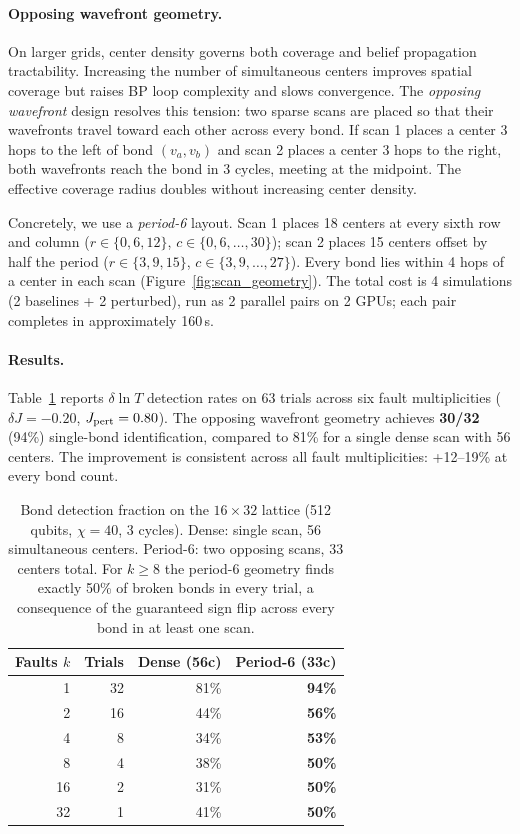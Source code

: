 \documentclass[11pt]{article}
\begin{document}
\paragraph{Opposing wavefront geometry.}
On larger grids, center density governs both coverage and belief propagation
tractability. Increasing the number of simultaneous centers improves spatial
coverage but raises BP loop complexity and slows convergence. The \emph{opposing
wavefront} design resolves this tension: two sparse scans are placed so that
their wavefronts travel toward each other across every bond. If scan 1 places a
center 3 hops to the left of bond $(v_a, v_b)$ and scan 2 places a center 3
hops to the right, both wavefronts reach the bond in 3 cycles, meeting at the
midpoint. The effective coverage radius doubles without increasing center density.

Concretely, we use a \emph{period-6} layout. Scan 1 places 18 centers at every
sixth row and column ($r \in \{0,6,12\}$, $c \in \{0,6,\ldots,30\}$); scan 2
places 15 centers offset by half the period ($r \in \{3,9,15\}$,
$c \in \{3,9,\ldots,27\}$). Every bond lies within 4 hops of a center in each
scan (Figure~\ref{fig:scan_geometry}).
The total cost is 4 simulations (2 baselines + 2 perturbed), run as 2 parallel
pairs on 2 GPUs; each pair completes in approximately 160\,s.

\paragraph{Results.}
Table~\ref{tab:scaling} reports $\delta\!\ln T$ detection rates on 63 trials
across six fault multiplicities ($\delta J = -0.20$, $J_{\rm pert} = 0.80$).
The opposing wavefront geometry achieves \textbf{30/32} (94\%) single-bond
identification, compared to 81\% for a single dense scan with 56 centers. The
improvement is consistent across all fault multiplicities: +12--19\% at every
bond count.

\begin{table}[h]
\centering
\small
\begin{tabular}{rrrr}
\toprule
Faults $k$ & Trials & Dense (56c) & Period-6 (33c) \\
\midrule
 1 & 32 & 81\% & \textbf{94\%} \\
 2 & 16 & 44\% & \textbf{56\%} \\
 4 &  8 & 34\% & \textbf{53\%} \\
 8 &  4 & 38\% & \textbf{50\%} \\
16 &  2 & 31\% & \textbf{50\%} \\
32 &  1 & 41\% & \textbf{50\%} \\
\bottomrule
\end{tabular}
\caption{Bond detection fraction on the $16\times32$ lattice (512 qubits,
$\chi=40$, 3 cycles). Dense: single scan, 56 simultaneous centers.
Period-6: two opposing scans, 33 centers total. For $k\geq8$ the period-6
geometry finds exactly 50\% of broken bonds in every trial, a consequence
of the guaranteed sign flip across every bond in at least one scan.}
\label{tab:scaling}
\end{table}
\end{document}
